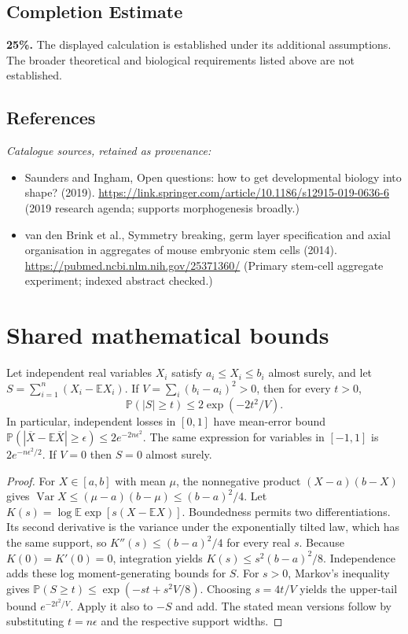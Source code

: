\documentclass[11pt]{article}
\begin{document}
\subsection{Completion Estimate}
\textbf{25\%.} The displayed calculation is established under its additional assumptions. The broader theoretical and biological requirements listed above are not established.
\subsection{References}
\noindent\emph{Catalogue sources, retained as provenance:}
\begin{itemize}
\item Saunders and Ingham, Open questions: how to get developmental biology into shape? (2019). \url{https://link.springer.com/article/10.1186/s12915-019-0636-6} (2019 research agenda; supports morphogenesis broadly.)
\item van den Brink et al., Symmetry breaking, germ layer specification and axial organisation in aggregates of mouse embryonic stem cells (2014). \url{https://pubmed.ncbi.nlm.nih.gov/25371360/} (Primary stem-cell aggregate experiment; indexed abstract checked.)
\end{itemize}




\section{Shared mathematical bounds}\label{app:bounds}
\begin{lemma}\label{lem:bounded}
Let independent real variables $X_i$ satisfy $a_i\leq X_i\leq b_i$ almost surely,
and let $S=\sum_{i=1}^n(X_i-\mathbb{E} X_i)$. If
$V=\sum_i(b_i-a_i)^2>0$, then for every $t>0$,
\[
 \mathbb{P}(|S|\geq t)\leq 2\exp(-2t^2/V).
\]
In particular, independent losses in $[0,1]$ have mean-error bound
$\mathbb{P}(|\overline X-\mathbb{E}\overline X|\geq\epsilon)
\leq2e^{-2n\epsilon^2}$. The same expression for variables in $[-1,1]$
is $2e^{-n\epsilon^2/2}$. If $V=0$ then $S=0$ almost surely.
\end{lemma}
\begin{proof}
For $X\in[a,b]$ with mean $\mu$, the nonnegative product
$(X-a)(b-X)$ gives
$\operatorname{Var} X\leq(\mu-a)(b-\mu)\leq(b-a)^2/4$.
Let $K(s)=\log\mathbb{E}\exp[s(X-\mathbb{E} X)]$.
Boundedness permits two differentiations. Its second derivative is the variance
under the exponentially tilted law, which has the same support, so
$K''(s)\leq(b-a)^2/4$ for every real $s$.
Because $K(0)=K'(0)=0$, integration yields
$K(s)\leq s^2(b-a)^2/8$.
Independence adds these log moment-generating bounds for $S$.
For $s>0$, Markov's inequality gives
$\mathbb{P}(S\geq t)\leq\exp(-st+s^2V/8)$.
Choosing $s=4t/V$ yields the upper-tail bound $e^{-2t^2/V}$.
Apply it also to $-S$ and add. The stated mean versions follow by substituting
$t=n\epsilon$ and the respective support widths.
\end{proof}
\end{document}
